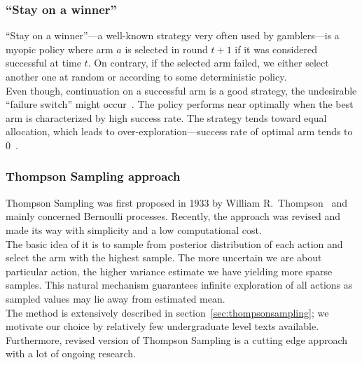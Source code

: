 \documentclass[12pt, a4paper, pdflatex, leqno, twoside]{report}
\begin{document}
\subsubsection{``Stay on a winner''}
``Stay on a winner''---a well-known strategy very often used by gamblers---is a myopic policy 
where arm $a$ is selected in round $t+1$ if it was considered successful at 
time $t$. On contrary, if the selected arm failed, we either select another one at random or 
according to some deterministic policy.\\

Even though, continuation on a successful arm is a good strategy, the undesirable ``failure switch'' might occur~\citep{berry+firstedt}. The policy performs near optimally when the best arm is characterized by high success rate. The strategy tends toward equal allocation, which leads to over-exploration---success rate of optimal arm tends to $0$~\citep{Scott:2010:MBL:1944422.1944432}.\\ 



\subsubsection{Thompson Sampling approach}
Thompson Sampling was first proposed in 1933 by William R.\ Thompson~\citep{thompson:biom33} and mainly concerned Bernoulli processes. Recently, the approach was revised and made its way with  simplicity and a low 
computational cost.\\

The basic idea of it is to sample from posterior distribution of 
each action and select the arm with the highest sample. The more uncertain we are about 
particular action, the higher variance estimate we have yielding more sparse 
samples. This natural mechanism guarantees infinite exploration of all actions as sampled values may lie away from estimated mean.\\

The method is extensively described in section~\ref{sec:thompsonsampling}; we 
motivate our choice by relatively few undergraduate level texts available. 
Furthermore, revised version of Thompson Sampling is a cutting edge approach with a lot of ongoing 
research.\\
\end{document}
